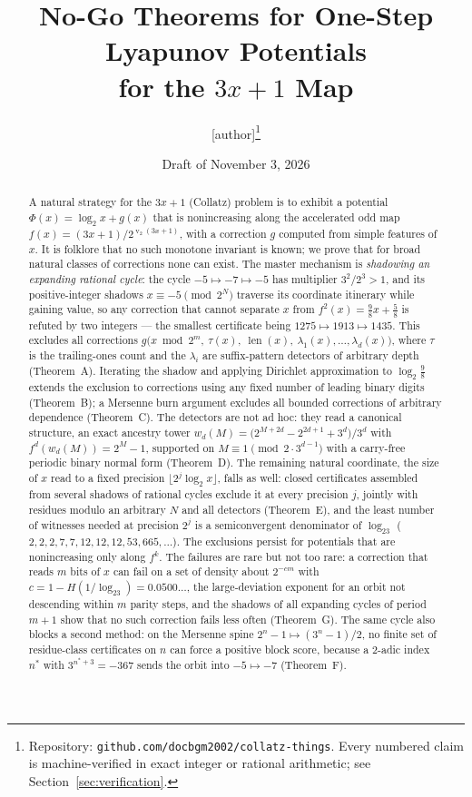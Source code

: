 \documentclass[11pt]{article}
\title{No-Go Theorems for One-Step Lyapunov Potentials\\ for the $3x+1$ Map}
\author{[author]\thanks{Repository: \texttt{github.com/docbgm2002/collatz-things}.
Every numbered claim is machine-verified in exact integer or rational
arithmetic; see Section~\ref{sec:verification}.}}
\date{Draft of November 3, 2026}
\theoremstyle{definition}
\theoremstyle{remark}
\newcommand{\bitlen}{\operatorname{len}}
\DeclareMathOperator{\vv}{v}
\begin{document}
\maketitle

\begin{abstract}
A natural strategy for the $3x+1$ (Collatz) problem is to exhibit a
potential $\Phi(x)=\log_2x+g(x)$ that is nonincreasing along the
accelerated odd map $f(x)=(3x+1)/2^{\vv_2(3x+1)}$, with a correction $g$
computed from simple features of $x$. It is folklore that no such
monotone invariant is known; we prove that for broad natural classes of
corrections none can exist. The master mechanism is \emph{shadowing an
expanding rational cycle}: the cycle $-5\mapsto-7\mapsto-5$ has
multiplier $3^2/2^3>1$, and its positive-integer shadows
$x\equiv-5\pmod{2^N}$ traverse its coordinate itinerary while gaining
value, so any correction that cannot separate $x$ from
$f^2(x)=\tfrac98x+\tfrac58$ is refuted by two integers --- the smallest
certificate being $1275\mapsto1913\mapsto1435$. This excludes all
corrections $g\bigl(x\bmod2^m,\ \tau(x),\ \bitlen(x),\
\lambda_1(x),\dots,\lambda_d(x)\bigr)$, where $\tau$ is the
trailing-ones count and the $\lambda_i$ are suffix-pattern detectors of
arbitrary depth (Theorem~A). Iterating the shadow and applying
Dirichlet approximation to $\log_2\frac98$ extends the exclusion to
corrections using any fixed number of leading binary digits
(Theorem~B); a Mersenne burn argument excludes all bounded corrections
of arbitrary dependence (Theorem~C). The detectors are not ad hoc: they
read a canonical structure, an exact ancestry tower
$w_d(M)=\bigl(2^{M+2d}-2^{2d+1}+3^{d}\bigr)/3^{d}$ with
$f^{d}(w_d(M))=2^{M}-1$, supported on $M\equiv1\pmod{2\cdot3^{d-1}}$
with a carry-free periodic binary normal form (Theorem~D). The
remaining natural coordinate, the size of $x$ read to a fixed
precision $\lfloor2^{j}\log_2x\rfloor$, falls as well: closed
certificates assembled from several shadows of rational cycles exclude
it at every precision $j$, jointly with residues modulo an arbitrary
$N$ and all detectors (Theorem~E), and the least number of witnesses
needed at precision $2^{j}$ is a semiconvergent denominator of
$\log_23$ ($2,2,2,7,7,12,12,12,53,665,\dots$). The exclusions persist
for potentials that are nonincreasing only along $f^{k}$. The failures
are rare but not too rare: a correction that reads $m$ bits of $x$ can
fail on a set of density about $2^{-cm}$ with $c=1-H(1/\log_23)=0.0500\ldots$,
the large-deviation exponent for an orbit not descending within $m$
parity steps, and the shadows of all expanding cycles of period $m+1$
show that no such correction fails less often (Theorem~G). The same
cycle also blocks a second method: on the Mersenne spine $2^{n}-1\mapsto(3^{n}-1)/2$,
no finite set of residue-class certificates on $n$ can force a positive
block score, because a $2$-adic index $n^{*}$ with $3^{n^{*}+3}=-367$
sends the orbit into $-5\mapsto-7$ (Theorem~F).
\end{abstract}
\end{document}
